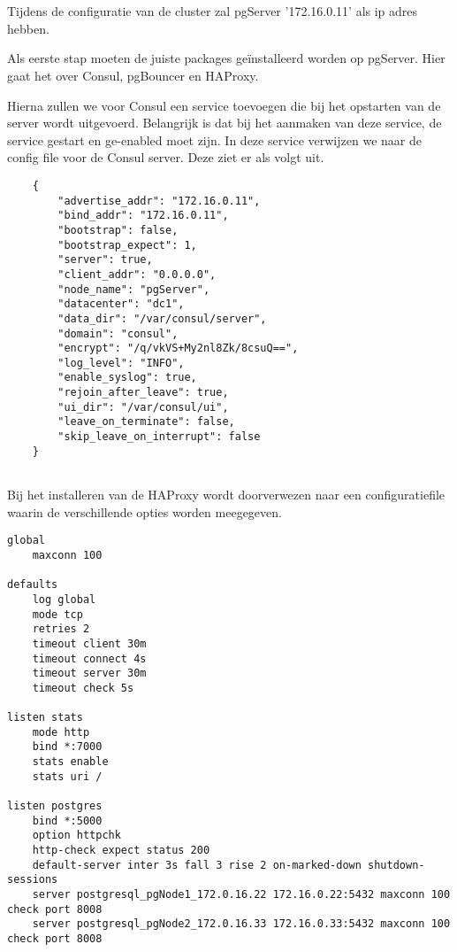 \section{}
\label{sec:pgServer}
Tijdens de configuratie van de cluster zal pgServer '172.16.0.11' als ip adres hebben.

Als eerste stap moeten de juiste packages geïnstalleerd worden op pgServer. Hier gaat het over Consul, pgBouncer en HAProxy.

Hierna zullen we voor Consul een service toevoegen die bij het opstarten van de server wordt uitgevoerd. Belangrijk is dat bij het aanmaken van deze service, de service gestart en ge-enabled moet zijn. In deze service verwijzen we naar de config file voor de Consul server. Deze ziet er als volgt uit.

\begin{lstlisting}
    {
        "advertise_addr": "172.16.0.11",
        "bind_addr": "172.16.0.11",
        "bootstrap": false,
        "bootstrap_expect": 1,
        "server": true,
        "client_addr": "0.0.0.0",
        "node_name": "pgServer",
        "datacenter": "dc1",
        "data_dir": "/var/consul/server",
        "domain": "consul",
        "encrypt": "/q/vkVS+My2nl8Zk/8csuQ==",
        "log_level": "INFO",
        "enable_syslog": true,
        "rejoin_after_leave": true,
        "ui_dir": "/var/consul/ui",
        "leave_on_terminate": false,
        "skip_leave_on_interrupt": false
    }
    
 \end{lstlisting}

Bij het installeren van de HAProxy wordt doorverwezen naar een configuratiefile waarin de verschillende opties worden meegegeven.

\begin{lstlisting}
global
    maxconn 100

defaults
    log global
    mode tcp
    retries 2
    timeout client 30m
    timeout connect 4s
    timeout server 30m
    timeout check 5s

listen stats
    mode http
    bind *:7000
    stats enable
    stats uri /

listen postgres
    bind *:5000
    option httpchk
    http-check expect status 200
    default-server inter 3s fall 3 rise 2 on-marked-down shutdown-sessions
    server postgresql_pgNode1_172.0.16.22 172.16.0.22:5432 maxconn 100 check port 8008
    server postgresql_pgNode2_172.0.16.33 172.16.0.33:5432 maxconn 100 check port 8008
\end{lstlisting}


